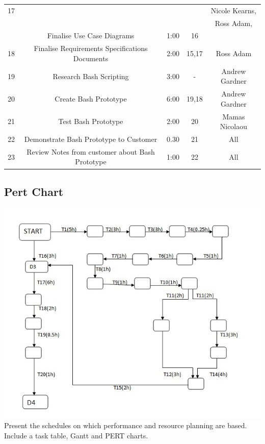 \documentclass{l3deliverable}
\begin{document}
{\begin{table}
\begin{tabular}{|c |c |c |c |c |}
\hline17 &  & & & Nicole Kearns, \\
 & & & & Ross Adam, \\
 & Finalise Use Case Diagrams &1:00  &16 & \\
\hline18 & Finalise Requirements Specifications Documents & 2:00 &15,17& Ross Adam \\
\hline19 & Research Bash Scripting & 3:00 &-&Andrew Gardner\\
\hline20 & Create Bash Prototype & 6:00 &19,18&Andrew Gardner \\
\hline21 & Test Bash Prototype & 2:00 &20& Mamas Nicolaou \\
\hline22 & Demonstrate Bash Prototype to Customer & 0.30 &21& All\\     
\hline23 & Review Notes from customer about Bash Prototype & 1:00 &22& All\\      
\hline %
\end{tabular}
\label{table:nonlin} %
\end{table}
\pagebreak

\subsection{Pert Chart}
\includegraphics[scale=0.7]{img/PERT.jpg}
Present the schedules on which performance and resource planning are
based. Include a task table, Gantt and PERT charts.


}
\end{document}
